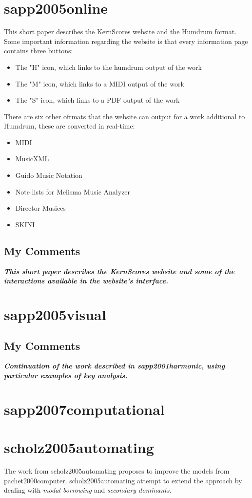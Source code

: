 	\section{sapp2005online }
		This short paper describes the KernScores website and the Humdrum format.
		Some important information regarding the website is that every information page contains three buttons:
		\begin{itemize}
			\item The "H" icon, which links to the humdrum output of the work
			\item The "M" icon, which links to a MIDI output of the work
			\item The "S" icon, which links to a PDF output of the work
		\end{itemize}
		There are six other ofrmats that the website can output for a work additional to Humdrum, these are converted in real-time:
		\begin{itemize}
			\item MIDI
			\item MusicXML
			\item Guido Music Notation
			\item Note lists for Melisma Music Analyzer
			\item Director Musices
			\item SKINI
		\end{itemize}
		\subsection{My Comments}
			\emph{\textbf{
				This short paper describes the KernScores website and some of the interactions available in the website's interface.
			}}
	\section{sapp2005visual }
		\subsection{My Comments}
			\emph{\textbf{
				Continuation of the work described in sapp2001harmonic, using particular examples of key analysis.
			}}
	\section{sapp2007computational }
	\section{scholz2005automating }
		The work from scholz2005automating proposes to improve the models from pachet2000computer. scholz2005automating attempt to extend the approach by dealing with \emph{modal borrowing} and \emph{secondary dominants}.
